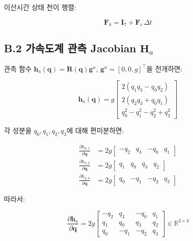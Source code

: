 이산시간 상태 천이 행렬:
 
\begin{equation}
    \mathbf{F}_k = \mathbf{I}_7 + \mathbf{F}_c\,\Delta t
    \tag{B.6}
\end{equation}
 
\subsection*{B.2 가속도계 관측 Jacobian $\mathbf{H}_a$}
 
관측 함수 $\mathbf{h}_a(\mathbf{q}) = \mathbf{R}(\mathbf{q})\mathbf{g}^n$,
$\mathbf{g}^n = [0, 0, g]^\top$을 전개하면:
 
\begin{equation}
    \mathbf{h}_a(\mathbf{q}) = g\begin{bmatrix}
        2(q_1 q_3 - q_0 q_2) \\
        2(q_2 q_3 + q_0 q_1) \\
        q_0^2 - q_1^2 - q_2^2 + q_3^2
    \end{bmatrix}
    \tag{B.7}
\end{equation}
 
각 성분을 $q_0, q_1, q_2, q_3$에 대해 편미분하면:
 
\begin{align}
    \frac{\partial h_{a,1}}{\partial \mathbf{q}} &= 2g\begin{bmatrix} -q_2 & q_3 & -q_0 & q_1 \end{bmatrix} \tag{B.8} \\
    \frac{\partial h_{a,2}}{\partial \mathbf{q}} &= 2g\begin{bmatrix}  q_1 & q_0 &  q_3 & q_2 \end{bmatrix} \tag{B.9} \\
    \frac{\partial h_{a,3}}{\partial \mathbf{q}} &= 2g\begin{bmatrix}  q_0 & -q_1 & -q_2 & q_3 \end{bmatrix} \tag{B.10}
\end{align}
 
따라서:
 
\begin{equation}
    \frac{\partial \mathbf{h}_a}{\partial \mathbf{q}} = 2g
    \begin{bmatrix}
        -q_2 &  q_3 & -q_0 &  q_1 \\
         q_1 &  q_0 &  q_3 &  q_2 \\
         q_0 & -q_1 & -q_2 &  q_3
    \end{bmatrix}
    \in \mathbb{R}^{3\times 4}
    \tag{B.11}
\end{equation}
 
